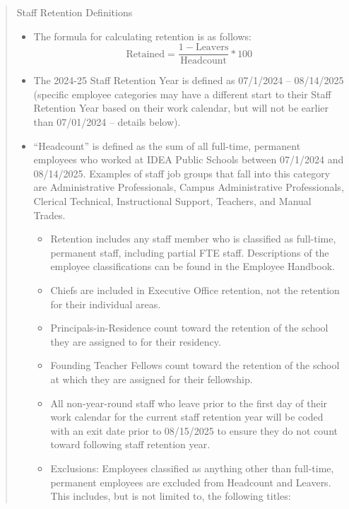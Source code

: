 \documentclass[
  letterpaper,
  DIV=11,
  numbers=noendperiod]{scrreprt}
\providecommand{\tightlist}{%
  \setlength{\itemsep}{0pt}\setlength{\parskip}{0pt}}
\begin{document}
\begin{quote}
Staff Retention Definitions

\begin{itemize}
\tightlist
\item
  The formula for calculating retention is as follows:
  \[\text{Retained} = \frac{1-\text{Leavers}}{\text{Headcount}}*100\]
\item
  The 2024-25 Staff Retention Year is defined as 07/1/2024 -- 08/14/2025
  (specific employee categories may have a different start to their
  Staff Retention Year based on their work calendar, but will not be
  earlier than 07/01/2024 -- details below).
\item
  ``Headcount'' is defined as the sum of all full-time, permanent
  employees who worked at IDEA Public Schools between 07/1/2024 and
  08/14/2025. Examples of staff job groups that fall into this category
  are Administrative Professionals, Campus Administrative Professionals,
  Clerical Technical, Instructional Support, Teachers, and Manual
  Trades.

  \begin{itemize}
  \tightlist
  \item
    Retention includes any staff member who is classified as full-time,
    permanent staff, including partial FTE staff. Descriptions of the
    employee classifications can be found in the Employee Handbook.
  \item
    Chiefs are included in Executive Office retention, not the retention
    for their individual areas.
  \item
    Principals-in-Residence count toward the retention of the school
    they are assigned to for their residency.
  \item
    Founding Teacher Fellows count toward the retention of the school at
    which they are assigned for their fellowship.
  \item
    All non-year-round staff who leave prior to the first day of their
    work calendar for the current staff retention year will be coded
    with an exit date prior to 08/15/2025 to ensure they do not count
    toward following staff retention year.
  \item
    Exclusions: Employees classified as anything other than full-time,
    permanent employees are excluded from Headcount and Leavers. This
    includes, but is not limited to, the following titles:


\end{itemize}
\end{itemize}
\end{quote}
\end{document}
